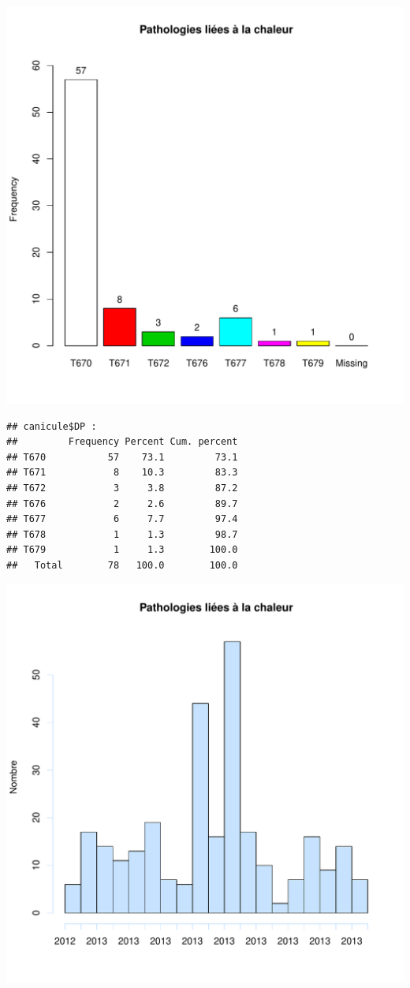 \documentclass[12pt,english,french,twoside]{report}\usepackage[]{graphicx}\usepackage[]{color}
\makeatletter
\def\maxwidth{ %
  \ifdim\Gin@nat@width>\linewidth
    \linewidth
  \else
    \Gin@nat@width
  \fi
}
\newenvironment{kframe}{%
 \def\at@end@of@kframe{}%
 \ifinner\ifhmode%
  \def\at@end@of@kframe{\end{minipage}}%
  \begin{minipage}{\columnwidth}%
 \fi\fi%
 \def\FrameCommand##1{\hskip\@totalleftmargin \hskip-\fboxsep
 \colorbox{shadecolor}{##1}\hskip-\fboxsep
     \hskip-\linewidth \hskip-\@totalleftmargin \hskip\columnwidth}%
 \MakeFramed {\advance\hsize-\width
   \@totalleftmargin\z@ \linewidth\hsize
   \@setminipage}}%
 {\par\unskip\endMakeFramed%
 \at@end@of@kframe}
\newenvironment{knitrout}{}{} %
\makeatother
\begin{document}
\begin{knitrout}
\includegraphics[width=\maxwidth]{figure/canicule2} 
\begin{kframe}\begin{verbatim}
## canicule$DP : 
##         Frequency Percent Cum. percent
## T670           57    73.1         73.1
## T671            8    10.3         83.3
## T672            3     3.8         87.2
## T676            2     2.6         89.7
## T677            6     7.7         97.4
## T678            1     1.3         98.7
## T679            1     1.3        100.0
##   Total        78   100.0        100.0
\end{verbatim}
\end{kframe}
\includegraphics[width=\maxwidth]{figure/canicule3} 

\end{knitrout}
\end{document}
